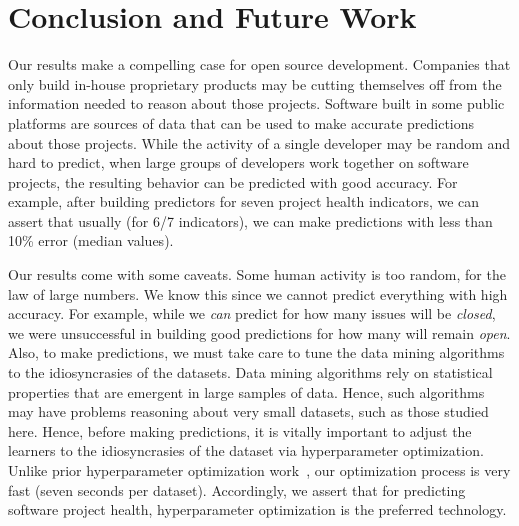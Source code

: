 \documentclass[sigconf,review,anonymous]{acmart}
\begin{document}
\section{Conclusion and Future Work}
\label{sect:concl}

 

Our results make a compelling case for open source development. Companies that only build in-house proprietary products may be cutting themselves off from the information needed to reason about those projects. Software built in some public platforms are sources
of data that can be used to
make accurate predictions  about those projects. While the activity of a single developer may be random and hard to predict, when large groups of developers work together on software projects,
the resulting behavior can be predicted with good accuracy. For example, after building predictors for seven project health indicators, we can assert that usually (for 6/7 indicators), we can make predictions with less than 10\% error (median values). 

Our results come with some caveats. Some human activity is  too random, for the law of large numbers. We know this since we cannot predict everything  
 with high accuracy. For example, 
 while we {\em can}  predict 
 for how many issues will be {\em closed}, we were   unsuccessful in building good predictions for     how many  will remain {\em open}. 
 Also, to make predictions, we must take care to tune the data mining algorithms to the idiosyncrasies of the datasets.
 Data mining algorithms rely on statistical properties that are emergent in large samples of data.
 Hence, such algorithms may have problems reasoning about very small datasets, such as those studied here.
 Hence, before making predictions, it is vitally   important to adjust the learners to the idiosyncrasies of the dataset via hyperparameter optimization. Unlike prior hyperparameter optimization work~\cite{Fu2016TuningFS}, our optimization process is very fast (seven seconds per dataset). Accordingly, we assert that for predicting software project health, hyperparameter optimization is the preferred technology.
 
\end{document}
